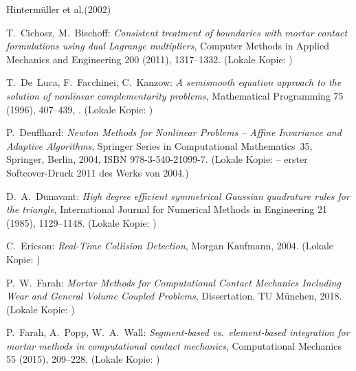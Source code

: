 \documentclass[a4paper,11pt]{article}
\begin{document}
\clearpage
\begin{thebibliography}{Hintermüller et al.(2002)}

 T.~Cichosz, M.~Bischoff: \emph{Consistent treatment of boundaries with mortar contact formulations using dual Lagrange multipliers}, Computer Methods in Applied Mechanics and Engineering 200 (2011), 1317--1332. (Lokale Kopie: )

 T.~De~Luca, F.~Facchinei, C.~Kanzow: \emph{A semismooth equation approach to the solution of nonlinear complementarity problems}, Mathematical Programming 75 (1996), 407--439, . (Lokale Kopie: )

 P.~Deuflhard: \emph{Newton Methods for Nonlinear Problems -- Affine Invariance and Adaptive Algorithms}, Springer Series in Computational Mathematics~35, Springer, Berlin, 2004, ISBN 978-3-540-21099-7. (Lokale Kopie:  -- erster Softcover-Druck 2011 des Werks von 2004.)

 D.~A.~Dunavant: \emph{High degree efficient symmetrical Gaussian quadrature rules for the triangle}, International Journal for Numerical Methods in Engineering 21 (1985), 1129--1148. (Lokale Kopie: )

 C.~Ericson: \emph{Real-Time Collision Detection}, Morgan Kaufmann, 2004. (Lokale Kopie: )

 P.~W.~Farah: \emph{Mortar Methods for Computational Contact Mechanics Including Wear and General Volume Coupled Problems}, Dissertation, TU M\"unchen, 2018. (Lokale Kopie: )

 P.~Farah, A.~Popp, W.~A.~Wall: \emph{Segment-based vs.\ element-based integration for mortar methods in computational contact mechanics}, Computational Mechanics 55 (2015), 209--228. (Lokale Kopie: )


\end{thebibliography}
\end{document}
